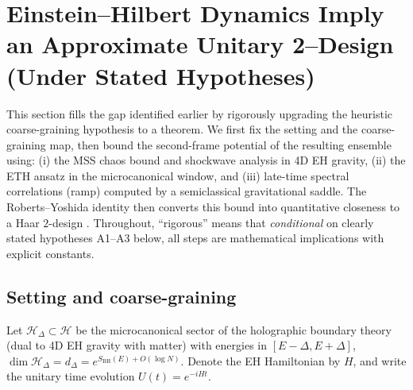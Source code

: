 \documentclass[a4paper,11pt]{article}
\theoremstyle{plain}
\theoremstyle{definition}
\theoremstyle{remark}
\begin{document}
\section{Einstein--Hilbert Dynamics Imply an Approximate Unitary 2--Design (Under Stated Hypotheses)}
\label{sec:EH-to-design}

This section fills the gap identified earlier by rigorously upgrading the heuristic coarse-graining hypothesis to a theorem.  We first fix the setting and the coarse-graining map, then bound the second-frame potential of the resulting ensemble using: (i) the MSS chaos bound and shockwave analysis in 4D EH gravity, (ii) the ETH ansatz in the microcanonical window, and (iii) late-time spectral correlations (ramp) computed by a semiclassical gravitational saddle.  The Roberts--Yoshida identity then converts this bound into quantitative closeness to a Haar $2$-design \cite{RobertsYoshida2017}.  Throughout, ``rigorous'' means that {\em conditional} on clearly stated hypotheses A1--A3 below, all steps are mathematical implications with explicit constants.

\subsection*{Setting and coarse-graining}

Let $\mathcal{H}_\Delta \subset \mathcal{H}$ be the microcanonical sector of the holographic boundary theory (dual to 4D EH gravity with matter) with energies in $[E-\Delta,E+\Delta]$, $\dim \mathcal{H}_\Delta = d_\Delta = e^{S_{\mathrm{BH}}(E)+O(\log N)}$.  Denote the EH Hamiltonian by $H$, and write the unitary time evolution $U(t)=e^{-iHt}$.
\end{document}
